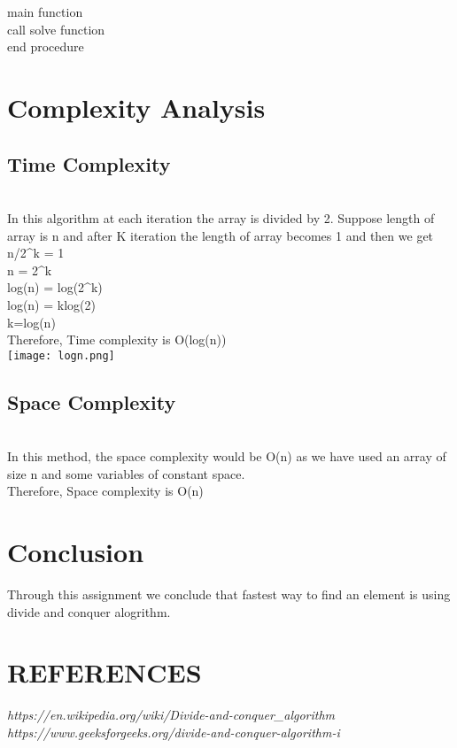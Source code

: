 \documentclass[conference]{IEEEtran}
\begin{document}
main function \\
\indent \hspace{0.5 cm} call solve function \\ 
end procedure

\section{Complexity Analysis}

\subsection{Time Complexity}\\
In this algorithm at each iteration the array is divided by 2. Suppose length of array is n and after K iteration the length of array becomes 1 and then we get\\
n/2^{k} = 1\\
n = 2^{k}\\
log(n) = log(2^{k})\\
log(n) = klog(2)\\
k=log(n)\\

Therefore, Time complexity is O(log(n))\\

\texttt{[image: logn.png]}

\subsection{Space Complexity}\\
In this method, the space complexity would be O(n) as we have used an array of size n and some variables of constant space.  \\

Therefore, Space complexity is O(n)\\

\section{Conclusion}
Through this assignment we conclude that fastest way to find an element is using divide and conquer alogrithm.
\section{REFERENCES}
\textit{https://en.wikipedia.org/wiki/Divide-and-conquer_algorithm }\\
\textit{https://www.geeksforgeeks.org/divide-and-conquer-algorithm-i}\\
\end{document}

